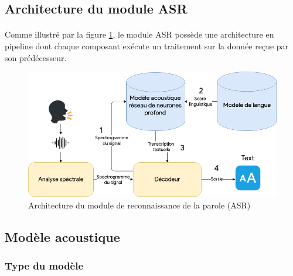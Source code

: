 	\subsection{Architecture du module ASR}
	\paragraph{}
	Comme illustré par la figure \ref{fig:asr}, le module ASR possède une architecture en pipeline dont chaque composant exécute un traitement sur la donnée reçue par son prédécesseur.
	\begin{figure}[h] 
		\centering
		\includegraphics[width=0.75\linewidth]{images/Conception/ASR/schema.png}
		\caption{Architecture du module de reconnaissance de la parole (ASR)}
		\label{fig:asr}
	\end{figure}

	\subsection{Modèle acoustique}
		\subsubsection*{Type du modèle}
